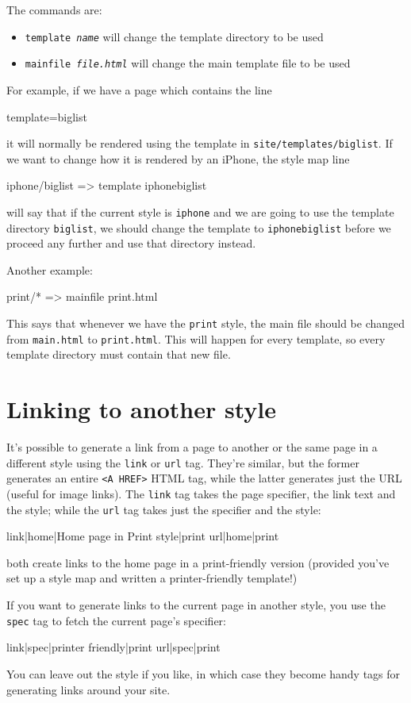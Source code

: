 The commands are:
\begin{itemize}
\item \texttt{template \emph{name}} will change the template directory to be used
\item \texttt{mainfile \emph{file.html}} will change the main template file to be used
\end{itemize}

For example, if we have a page which contains the line
\begin{MyVerbatim}
template=biglist
\end{MyVerbatim}
it will normally be rendered using the template in \texttt{site/templates/biglist}.
If we want to change how it is rendered by an iPhone, the style map line
\begin{MyVerbatim}
iphone/biglist => template iphonebiglist
\end{MyVerbatim}
will say that if the current style is \texttt{iphone} and we are
going to use the template directory \texttt{biglist}, we should change the template
to \texttt{iphonebiglist} before we proceed any further and use that
directory instead.

Another example:
\begin{MyVerbatim}
print/* => mainfile print.html
\end{MyVerbatim}
This says that whenever we have the \texttt{print} style, the main file
should be changed from \texttt{main.html} to \texttt{print.html}. This will
happen for every template, so every template directory must contain that
new file.

\section{Linking to another style}
It's possible to generate a link from a page to another or the same page
in a different style using the \texttt{link} or \texttt{url} tag. They're
similar, but the former generates an entire \texttt{<A HREF>} HTML tag,
while the latter generates just the URL (useful for image links). The \texttt{link} tag
takes the page specifier, the link text and the style; while the \texttt{url} tag
takes just the specifier and the style:
\begin{MyVerbatim}
{{link|home|Home page in Print style|print}}
{{url|home|print}}
\end{MyVerbatim}
both create links to the home page in a print-friendly version (provided you've
set up a style map and written a printer-friendly template!)

If you want to generate links to the current page in another style, you use the \texttt{spec} tag 
to fetch the current page's specifier:
\begin{MyVerbatim}
{{link|{{spec}}|printer friendly|print}}
{{url|{{spec}}|print}}
\end{MyVerbatim}
You can leave out the style if you like, in which case they become handy
tags for generating links around your site.

